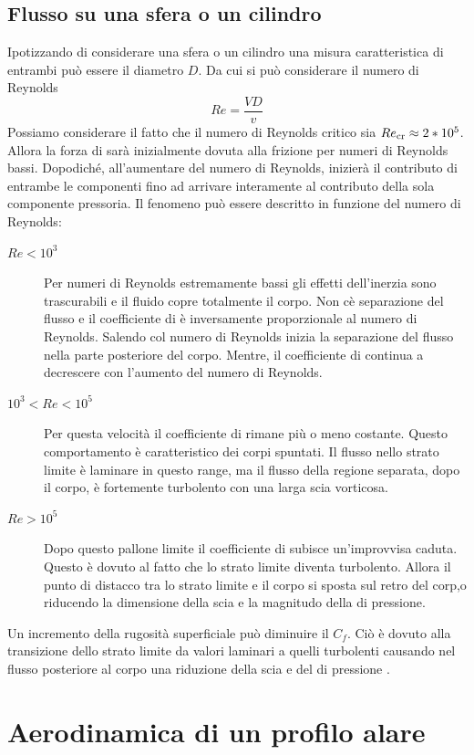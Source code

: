 \section{Flusso su una sfera o un cilindro}
Ipotizzando di considerare una sfera o un cilindro una misura caratteristica di entrambi può essere il diametro $D$.
Da cui si può considerare il numero di Reynolds 
\begin{equation}
Re = \frac{VD}{v}
\end{equation} 
Possiamo considerare il fatto che il numero di Reynolds critico sia $Re_{\textup{cr}} \approx 2*10^5$.
Allora la forza di  sarà inizialmente dovuta alla frizione per numeri di Reynolds bassi. Dopodiché, all'aumentare del numero di Reynolds, inizierà il contributo di entrambe le componenti fino ad arrivare interamente al contributo della sola componente pressoria.
Il fenomeno può essere descritto in funzione del numero di Reynolds:
\begin{description}
\item[$Re < 10^3$]Per numeri di Reynolds estremamente bassi gli effetti dell'inerzia sono trascurabili e il fluido copre totalmente il corpo. Non cè separazione del flusso e il coefficiente di  è inversamente proporzionale al numero di Reynolds. Salendo col numero di Reynolds inizia la separazione del flusso nella parte posteriore del corpo. Mentre, il coefficiente di  continua a decrescere con l'aumento del numero di Reynolds. 
\item[$10^3 < Re < 10^5$] Per questa velocità il coefficiente di  rimane più o meno costante. Questo comportamento è caratteristico dei corpi spuntati. Il flusso nello strato limite è laminare in questo range, ma il flusso della regione separata, dopo il corpo, è fortemente turbolento con una larga scia vorticosa.
\item[$Re > 10^5$]Dopo questo pallone limite il coefficiente di  subisce un'improvvisa caduta. Questo è dovuto al fatto che lo strato limite diventa turbolento. Allora il punto di distacco tra lo strato limite e il corpo si sposta sul retro del corp,o riducendo la dimensione della scia e la magnitudo della  di pressione. 
\end{description} 

Un incremento della rugosità superficiale può diminuire il $C_f$. Ciò è dovuto  alla transizione dello strato limite da valori laminari a quelli turbolenti causando nel flusso posteriore al corpo una riduzione della scia e del  di pressione . 

\chapter{Aerodinamica di un profilo alare}\label{ch:Airfoil}
